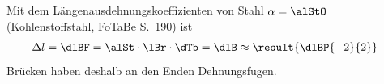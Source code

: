 Mit dem Längenausdehnungskoeffizienten von Stahl $\alpha = \alStO$ (Kohlenstoffstahl, FoTaBe S.~190) ist
\begin{align}
 \Delta l &= \dlBF = \alSt\cdot\lBr\cdot\dTb = \dlB \approx \result{\dlBP{-2}{2}}
\end{align}
Brücken haben deshalb an den Enden Dehnungsfugen.
